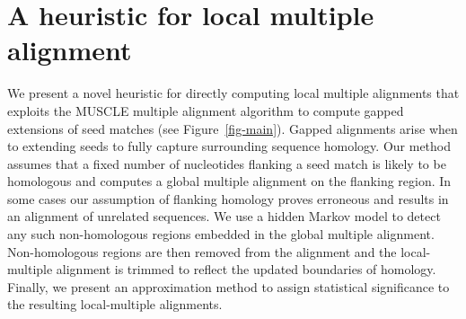 \documentclass{ws-procs9x6}
\begin{document}


\section{A heuristic for local multiple alignment}
We present a novel heuristic for directly computing local multiple alignments that exploits the MUSCLE multiple alignment algorithm to compute gapped extensions of seed matches (see Figure~\ref{fig-main}). Gapped alignments arise when to extending seeds to fully capture surrounding sequence homology. Our method assumes that a fixed number of nucleotides flanking a seed match is likely to be homologous and computes a global multiple alignment on the flanking region.  In some cases our assumption of flanking homology proves erroneous and results in an alignment of unrelated sequences.  We use a hidden Markov model to detect any such non-homologous regions embedded in the global multiple alignment.  Non-homologous regions are then removed from the alignment and the local-multiple alignment is trimmed to reflect the updated boundaries of homology.  Finally, we present an approximation method to assign statistical significance to the resulting local-multiple alignments.
\end{document}
